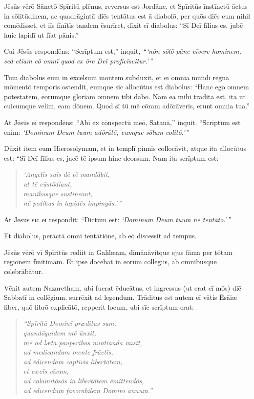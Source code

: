 \Caput
\Versus Jēsūs vērō Sānctō Spīritū plēnus, reversus est Jordāne, et Spīritūs īnstīnctū āctus in sōlitūdinem,
\Versus ac quadrāgintā diēs tentātus est ā diabolō, per quōs diēs cum nihil comēdisset, et iīs fīnītīs tandem ēsurīret,
\Versus dīxit eī diabolus: ``Sī Deī fīlius es, jubē huic lapidī ut fīat pānis.''

\Versus Cui Jēsūs respondēns: ``Scrīptum est,'' inquit, \emph{``{}`nōn sōlō pāne vīvere hominem, sed etiam eō omnī quod ex ōre Deī proficīscitur.'{}''}

\Versus Tum diabolus eum in excelsum montem subdūxit, et eī omnia mundī rēgna mōmen\-tō temporis ostendit,
\Versus eumque sīc allocūtus est diabolus: ``Hanc ego omnem potestātem, eōrumque glōriam omnem tibi dabō. Nam ea mihi trādita est, ita ut cuicumque velim, eam dōnem.
\Versus Quod sī tū mē cōram adōrāveris, erunt omnia tua.''

\Versus At Jēsūs eī respondēns: ``Abī ex cōnspectū meō, Satanā,'' inquit. ``Scrīptum est enim: \emph{`Dominum Deum tuum adōrātō, eumque sōlum colitō.'{}''}

\Versus Dūxit item eum Hierosolymam, et in templī pinnīs collocāvit, atque ita allocūtus est: ``Sī Deī fīlius es, jacē tē ipsum hinc deorsum.
\Versus Nam ita scrīptum est:
\begin{verse}
\begin{patverse*}
\emph{`Angelīs suīs dē tē mandābit,\\
ut tē cūstōdiant,\\
\Versus manibusque sustineant,\\
nē pedibus in lapidēs impingās.'{}''}
\end{patverse*}
\end{verse}


\Versus At Jēsūs sīc eī respondit: ``Dictum est: \emph{`Dominum Deum tuum nē tentātō.'{}''}

\Versus Et diabolus, perāctā omnī tentātiōne, ab eō discessit ad tempus.

\Versus Jēsūs vērō vī Spīritūs rediit in Galilæam, dīmānāvitque ejus fāma per tōtam regiōnem fīnitimam.
\Versus Et ipse docēbat in eōrum collēgiīs, ab omnibusque celebrābātur.

\Versus Vēnit autem Nazaretham, ubi fuerat ēducātus, et ingressus (ut erat eī mōs) diē Sabbatī in collēgium, surrēxit ad legendum.
\Versus Trāditus est autem eī vātis Ēsāiæ liber, quō librō explicātō, repperit locum, ubi sīc scrīptum erat:
\begin{verse}
\begin{patverse*}
\Versus \emph{``Spīritū Dominī præditus sum,\\
quandōquidem mē ūnxit,\\
mē ad læta pauperibus nūntianda mīsit,\\
ad medicandum mente frāctīs,\\
ad ēdīcendam captīvīs lībertātem,\\
et cæcīs vīsum,\\
ad calamitōsōs in lībertātem ēmittendōs,}\\
\Versus \emph{ad ēdīcendum favōrābilem Dominī annum.''}
\end{patverse*}
\end{verse}

